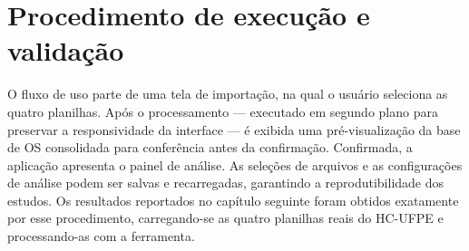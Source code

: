 \section{Procedimento de execução e validação}

O fluxo de uso parte de uma tela de importação, na qual o usuário seleciona as
quatro planilhas. Após o processamento --- executado em segundo plano para
preservar a responsividade da interface --- é exibida uma pré-visualização da
base de OS consolidada para conferência antes da confirmação. Confirmada, a
aplicação apresenta o painel de análise. As seleções de arquivos e as
configurações de análise podem ser salvas e recarregadas, garantindo a
reprodutibilidade dos estudos. Os resultados reportados no capítulo seguinte foram
obtidos exatamente por esse procedimento, carregando-se as quatro planilhas reais
do HC-UFPE e processando-as com a ferramenta.
